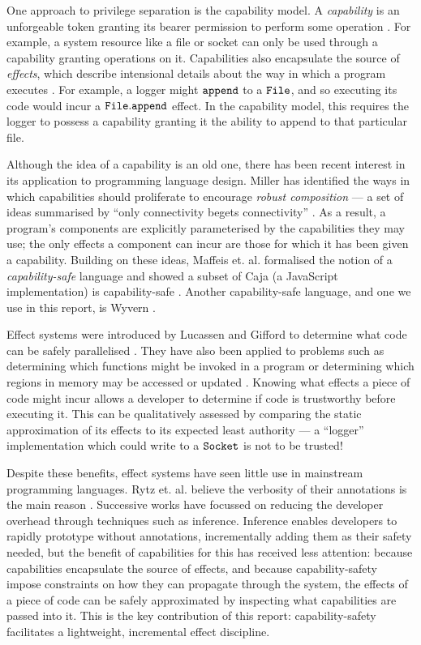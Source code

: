 One approach to privilege separation is the capability model. A \textit{capability} is an unforgeable token granting its bearer permission to perform some operation \cite{dennis66}. For example, a system resource like a file or socket can only be used through a capability granting operations on it. Capabilities also encapsulate the source of \textit{effects}, which describe intensional details about the way in which a program executes \cite{nielson99}. For example, a logger might $\mathtt{append}$ to a $\mathtt{File}$, and so executing its code would incur a $\mathtt{File.append}$ effect. In the capability model, this requires the logger to possess a capability granting it the ability to append to that particular file.

Although the idea of a capability is an old one, there has been recent interest in its application to programming language design. Miller has identified the ways in which capabilities should proliferate to encourage \textit{robust composition} --- a set of ideas summarised by ``only connectivity begets connectivity'' \cite{miller06}. As a result, a program's components are explicitly parameterised by the capabilities they may use; the only effects a component can incur are those for which it has been given a capability. Building on these ideas, Maffeis et. al. formalised the notion of a \textit{capability-safe} language and showed a subset of Caja (a JavaScript implementation) is capability-safe \cite{maffeis10}. Another capability-safe language, and one we use in this report, is Wyvern \cite{nistor13}.

Effect systems were introduced by Lucassen and Gifford to determine what code can be safely parallelised \cite{lucassen88}. They have also been applied to problems such as determining which functions might be invoked in a program \cite{tang94} or determining which regions in memory may be accessed or updated \cite{talpin94}. Knowing what effects a piece of code might incur allows a developer to determine if code is trustworthy before executing it. This can be qualitatively assessed by comparing the static approximation of its effects to its expected least authority --- a ``logger'' implementation which could write to a $\mathtt{Socket}$ is not to be trusted!

Despite these benefits, effect systems have seen little use in mainstream programming languages. Rytz et. al. believe the verbosity of their annotations is the main reason \cite{rytz2012}. Successive works have focussed on reducing the developer overhead through techniques such as inference. Inference enables developers to rapidly prototype without annotations, incrementally adding them as their safety needed, but the benefit of capabilities for this has received less attention: because capabilities encapsulate the source of effects, and because capability-safety impose constraints on how they can propagate through the system, the effects of a piece of code can be safely approximated by inspecting what capabilities are passed into it. This is the key contribution of this report: capability-safety facilitates a lightweight, incremental effect discipline.

